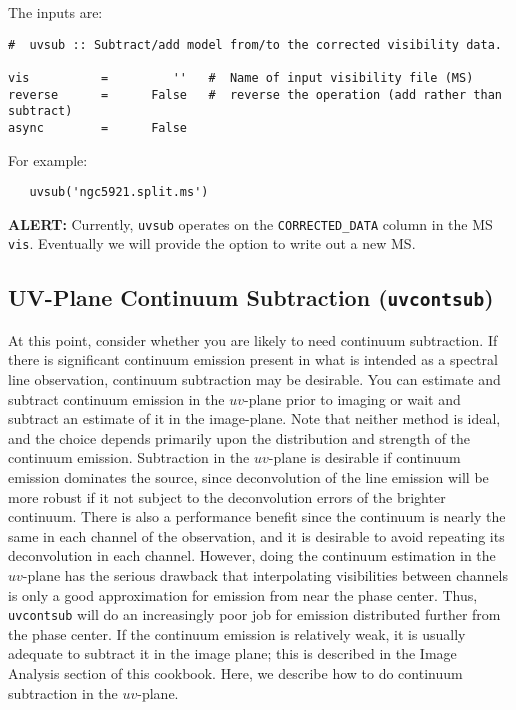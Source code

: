 The inputs are:

\small
\begin{verbatim}
#  uvsub :: Subtract/add model from/to the corrected visibility data.

vis          =         ''   #  Name of input visibility file (MS)
reverse      =      False   #  reverse the operation (add rather than subtract)
async        =      False   
\end{verbatim}
\normalsize

For example:
\small
\begin{verbatim}
   uvsub('ngc5921.split.ms')
\end{verbatim}
\normalsize

{\bf ALERT:} Currently, {\tt uvsub} operates on the {\tt CORRECTED\_DATA}
column in the MS {\tt vis}.  Eventually we will provide the option to
write out a new MS.

\subsection{UV-Plane Continuum Subtraction ({\tt uvcontsub})}
\label{section:cal.other.uvcontsub}

At this point, consider whether you are likely to need continuum
subtraction.  If there is significant continuum emission present in
what is intended as a spectral line observation, continuum subtraction
may be desirable.  You can estimate and subtract continuum emission in
the $uv$-plane prior to imaging or wait and subtract an estimate of it
in the image-plane.  Note that neither method is ideal, and the choice
depends primarily upon the distribution and strength of the continuum
emission.  Subtraction in the $uv$-plane is desirable if continuum emission dominates
the source, since deconvolution of the line emission will be more robust
if it not subject to the deconvolution errors of the brighter continuum.
There is also a performance benefit since the continuum is nearly the same
in each channel of the observation, and it is desirable to avoid repeating
its deconvolution in each channel.  However, doing the continuum
estimation in the $uv$-plane has the serious drawback that interpolating
visibilities between channels is only a good approximation for emission
from near the phase center.  Thus, {\tt uvcontsub} will do an increasingly
poor job for emission distributed further from the phase center. 
If the continuum emission is relatively weak,
it is usually adequate to subtract it in the image plane; this is
described in the Image Analysis section of this cookbook.  Here, we
describe how to do continuum subtraction in the $uv$-plane.

